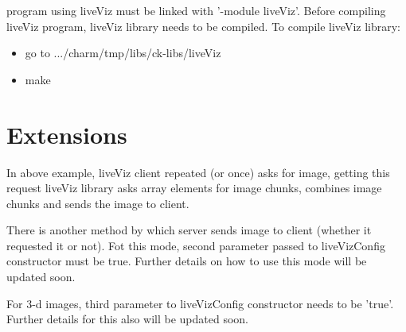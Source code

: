 \charmpp{} program using liveViz must be linked with '-module liveViz'. Before
compiling liveViz program, liveViz library needs to be compiled. To compile
liveViz library:
\begin{itemize}
\item go to .../charm/tmp/libs/ck-libs/liveViz
\item make
\end{itemize}

\section{Extensions}

In above example, liveViz client repeated (or once) asks for image, getting
this request liveViz library asks array elements for image chunks, combines
image chunks and sends the image to client.

There is another method by which server sends image to client (whether it
requested it or not). Fot this mode, second parameter passed to liveVizConfig
constructor must be true. Further details on how to use this mode will be
updated soon.

For 3-d images, third parameter to liveVizConfig constructor needs to be
'true'. Further details for this also will be updated soon. 
